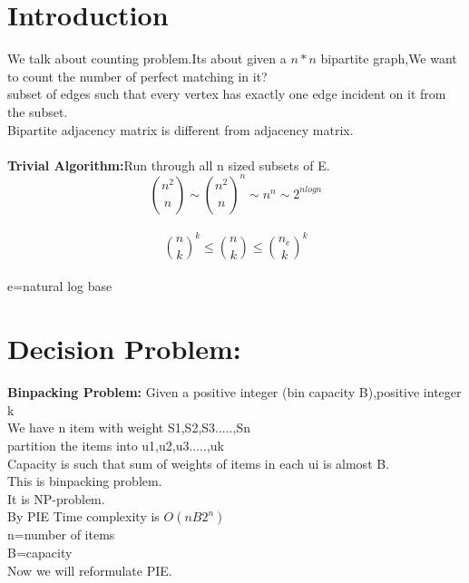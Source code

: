 
\section{Introduction} We talk about counting problem.Its about given a $n*n$ bipartite graph,We want to count the number of perfect matching in it?\\
subset of edges such that every vertex has exactly one edge incident on it from the
subset.\\
Bipartite adjacency matrix is different from adjacency matrix.\\ \\
\textbf{Trivial Algorithm:}Run through all n sized subsets of E.\\
$${n^{2} \choose n } \sim {n^{2} \choose n}^{n}    \sim n^{n} \sim 2^{nlogn}$$\\

$$ {n \choose k}^{k} \leq {n \choose k} \leq {n_e \choose k}^{k} $$\\
e=natural log base \\
\section{Decision Problem:}
\textbf{Binpacking Problem:}
Given a positive integer (bin capacity B),positive integer k\\
We have n item with weight S1,S2,S3.....,Sn\\
partition the items into u1,u2,u3.....,uk\\
Capacity is such that sum of weights of items in each ui is almost B.\\
This is binpacking problem.\\
It is NP-problem.\\
By PIE Time complexity is $O(nB2^{n})$\\
n=number of items\\
B=capacity\\
Now we will reformulate PIE.\\

